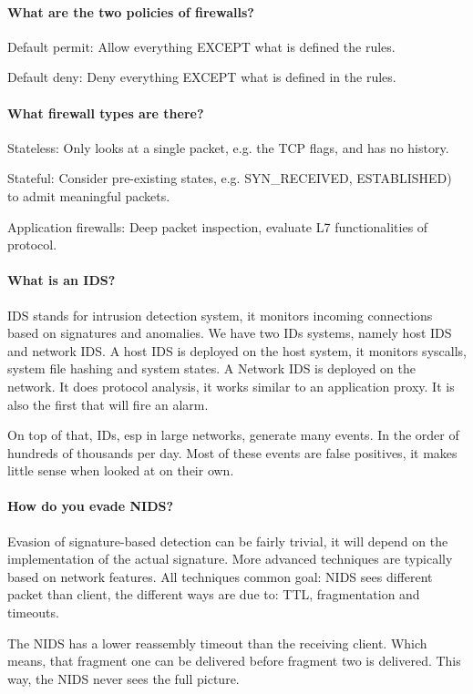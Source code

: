 \paragraph{What are the two policies of firewalls?}
Default permit: Allow everything EXCEPT what is defined the rules.

Default deny: Deny everything EXCEPT what is defined in the rules.

\paragraph{What firewall types are there?}
Stateless: Only looks at a single packet, e.g. the TCP flags, and has no history.

Stateful: Consider pre-existing states, e.g. SYN\_RECEIVED, ESTABLISHED) to admit meaningful packets.

Application firewalls: Deep packet inspection, evaluate L7 functionalities of protocol.

\paragraph{What is an IDS?}
IDS stands for intrusion detection system, it monitors incoming connections based on signatures and anomalies. We have two IDs systems, namely host IDS and network IDS. A host IDS is deployed on the host system, it monitors syscalls, system file hashing and system states. A Network IDS is deployed on the network. It does protocol analysis, it works similar to an application proxy. It is also the first that will fire an alarm.

On top of that, IDs, esp in large networks, generate many events. In the order of hundreds of thousands per day. Most of these events are false positives, it makes little sense when looked at on their own.

\paragraph{How do you evade NIDS?}
Evasion of signature-based detection can be fairly trivial, it will depend on the implementation of the actual signature. More advanced techniques are typically based on network features. All techniques common goal: NIDS sees different packet than client, the different ways are due to: TTL, fragmentation and timeouts.

The NIDS has a lower reassembly timeout than the receiving client. Which means, that fragment one can be delivered before fragment two is delivered. This way, the NIDS never sees the full picture.

